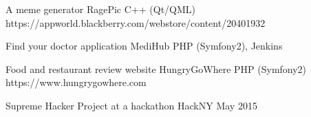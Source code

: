 \documentclass[]{awesome-cv}
\begin{document}
\vspace{-7mm}
\begin{cventries}
	\cventry
	{A meme generator}
	{RagePic}
	{C++ (Qt/QML)}
	{https://appworld.blackberry.com/webstore/content/20401932}
	{}
	
	\vspace{-5mm}
	\cventry
	{Find your doctor application}
	{MediHub}
	{PHP (Symfony2), Jenkins}
	{}
	{}
	
	\vspace{-5mm}
	\cventry
	{Food and restaurant review website}
	{HungryGoWhere}
	{PHP (Symfony2)}
	{https://www.hungrygowhere.com}
	{}
	
	\vspace{-5mm}
\end{cventries}
\begin{cvhonors}
	\cvhonor
	{Supreme Hacker}
	{Project at a hackathon}
	{HackNY}
	{May 2015}
\end{cvhonors}
\ 
\end{document}
